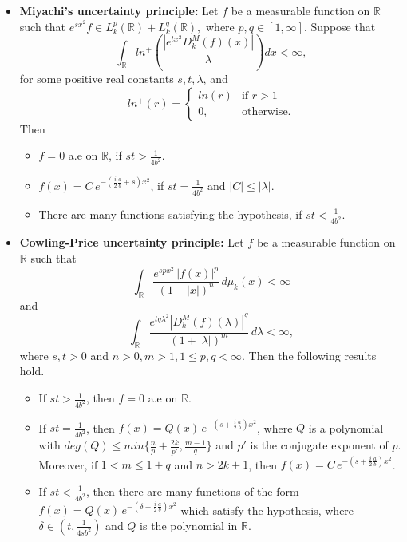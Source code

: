 \documentclass[12pt,a4paper,reqno]{amsproc}
\theoremstyle{definition}
\theoremstyle{remark}
\numberwithin{equation}{section}
\begin{document}
\begin{itemize}
\item \textbf{Miyachi's uncertainty principle:} Let $f$ be a measurable function on $\mathbb{R}$ such that $e^{sx^2}f\in L^p_k(\mathbb{R})+L^{q}_k(\mathbb{R}),$ where $  p,q\in [1, \infty]$. Suppose that
\begin{equation*}
\int_{\mathbb{R}} ln^+\left( \frac{|e^{tx^2} D_k^M(f)(x)|}{\lambda}\right) dx< \infty,    
\end{equation*}
for some positive real constants $s,t,\lambda$, and 
\begin{equation*}
ln^+(r)=\left \{\begin{array}{ll}
ln(r)& 
\text{if}\,\, r>1\\
0, & \text{otherwise}.
\end{array}\right. 
\end{equation*} 
Then
\begin{itemize}
    \item [$(i)$]  $f=0$  a.e on $\mathbb{R}$, if $st>\frac{1}{4b^2}$.
    \item[$(ii)$] $f(x) =  C\, e^{-\left(\frac{i}{2}\frac{a}{b}+s\right)x^2}$, if $st= \frac{1}{4b^2}$ and $|C|\le |\lambda|$.
    \item[$(iii)$] There are many functions satisfying the hypothesis, if $st<\frac{1}{4b^2}$.
\end{itemize}
\vspace{5pt}
\item {\textbf{Cowling-Price uncertainty principle:}} Let $f$ be a measurable function on $\mathbb{R}$  such that
\begin{equation*}
\int_{\mathbb{R}} \frac{e^{spx^2}\,|f(x)|^p}{(1+|x|)^n}\, d\mu_k(x) <\infty 
\end{equation*}
and 
\begin{equation*} 
\int_{\mathbb{R}} \frac{e^{tq\lambda^2} |D_k^M(f)(\lambda)|^q}{(1+|\lambda|)^m}\, d\lambda <\infty,
\end{equation*}
where $s,t>0$ and $n>0, m>1, 1\le p,q <\infty$. Then the following results hold.
\begin{itemize}
    \item [$(i)$] If $st>\frac{1}{4b^2}$, then $f=0$ a.e on $\mathbb{R}$.
    \item[$(ii)$] If $st= \frac{1}{4b^2}$, then  $f(x) = Q(x)\, e^{-(s+\frac{i}{2}\frac{a}{b})x^2}$, where $Q$ is a polynomial with $deg(Q) \le min \{\frac{n}{p}+ \frac{2k}{p'}, \frac{m-1}{q}\}$ and $p'$ is the conjugate exponent of $p$. Moreover, if  $1<m \le 1+q$ and $n>2k+1$, then $f(x)= C\,  e^{-(s+\frac{i}{2}\frac{a}{b})x^2}$. 
\item[$(iii)$] If $st<\frac{1}{4b^2}$, then there are many functions of the form $f(x) = Q(x)\,e^{-(\delta
+\frac{i}{2}\frac{a}{b})x^2}$ which satisfy the hypothesis, where $\delta \in (t, \frac{1}{4sb^2})$ and $Q$ is the polynomial in $\mathbb{R}$. 
\end{itemize}
\end{itemize}
\end{document}
